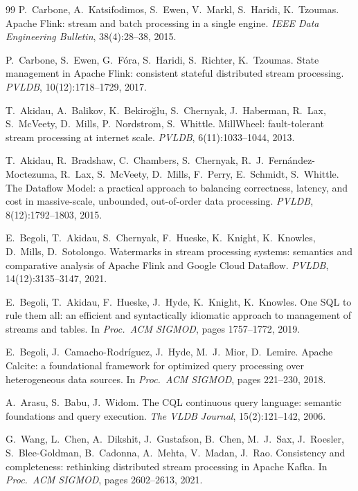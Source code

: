 \documentclass[11pt,a4paper]{article}
\renewcommand{\_}{\oldunderscore\allowbreak}
\begin{document}
\begin{thebibliography}{99}
 P.~Carbone, A.~Katsifodimos, S.~Ewen, V.~Markl, S.~Haridi, K.~Tzoumas. Apache
Flink: stream and batch processing in a single engine. \emph{IEEE Data Engineering Bulletin},
38(4):28--38, 2015.

 P.~Carbone, S.~Ewen, G.~F{\'o}ra, S.~Haridi, S.~Richter, K.~Tzoumas. State
management in Apache Flink: consistent stateful distributed stream processing. \emph{PVLDB},
10(12):1718--1729, 2017.

 T.~Akidau, A.~Balikov, K.~Bekiro{\u g}lu, S.~Chernyak, J.~Haberman, R.~Lax,
S.~McVeety, D.~Mills, P.~Nordstrom, S.~Whittle. MillWheel: fault-tolerant stream processing at internet
scale. \emph{PVLDB}, 6(11):1033--1044, 2013.

 T.~Akidau, R.~Bradshaw, C.~Chambers, S.~Chernyak, R.~J.~Fern{\'a}ndez-Moctezuma,
R.~Lax, S.~McVeety, D.~Mills, F.~Perry, E.~Schmidt, S.~Whittle. The Dataflow Model: a practical approach
to balancing correctness, latency, and cost in massive-scale, unbounded, out-of-order data processing.
\emph{PVLDB}, 8(12):1792--1803, 2015.

 E.~Begoli, T.~Akidau, S.~Chernyak, F.~Hueske, K.~Knight, K.~Knowles, D.~Mills,
D.~Sotolongo. Watermarks in stream processing systems: semantics and comparative analysis of Apache
Flink and Google Cloud Dataflow. \emph{PVLDB}, 14(12):3135--3147, 2021.

 E.~Begoli, T.~Akidau, F.~Hueske, J.~Hyde, K.~Knight, K.~Knowles. One SQL to rule
them all: an efficient and syntactically idiomatic approach to management of streams and tables. In
\emph{Proc.\ ACM SIGMOD}, pages 1757--1772, 2019.

 E.~Begoli, J.~Camacho-Rodr{\'i}guez, J.~Hyde, M.~J.~Mior, D.~Lemire. Apache
Calcite: a foundational framework for optimized query processing over heterogeneous data sources. In
\emph{Proc.\ ACM SIGMOD}, pages 221--230, 2018.

 A.~Arasu, S.~Babu, J.~Widom. The CQL continuous query language: semantic foundations
and query execution. \emph{The VLDB Journal}, 15(2):121--142, 2006.

 G.~Wang, L.~Chen, A.~Dikshit, J.~Gustafson, B.~Chen, M.~J.~Sax, J.~Roesler,
S.~Blee-Goldman, B.~Cadonna, A.~Mehta, V.~Madan, J.~Rao. Consistency and completeness: rethinking
distributed stream processing in Apache Kafka. In \emph{Proc.\ ACM SIGMOD}, pages 2602--2613, 2021.


\end{thebibliography}
\end{document}

